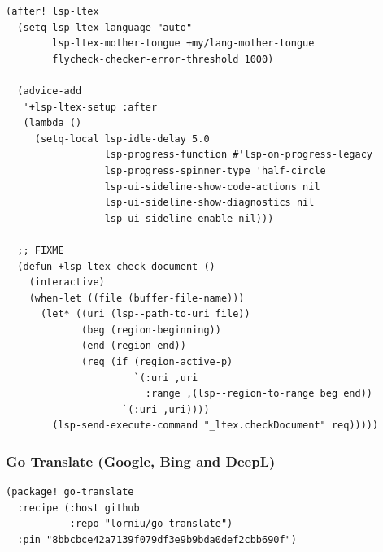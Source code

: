 \documentclass[11pt]{article}
\begin{document}
\begin{verbatim}
(after! lsp-ltex
  (setq lsp-ltex-language "auto"
        lsp-ltex-mother-tongue +my/lang-mother-tongue
        flycheck-checker-error-threshold 1000)

  (advice-add
   '+lsp-ltex-setup :after
   (lambda ()
     (setq-local lsp-idle-delay 5.0
                 lsp-progress-function #'lsp-on-progress-legacy
                 lsp-progress-spinner-type 'half-circle
                 lsp-ui-sideline-show-code-actions nil
                 lsp-ui-sideline-show-diagnostics nil
                 lsp-ui-sideline-enable nil)))

  ;; FIXME
  (defun +lsp-ltex-check-document ()
    (interactive)
    (when-let ((file (buffer-file-name)))
      (let* ((uri (lsp--path-to-uri file))
             (beg (region-beginning))
             (end (region-end))
             (req (if (region-active-p)
                      `(:uri ,uri
                        :range ,(lsp--region-to-range beg end))
                    `(:uri ,uri))))
        (lsp-send-execute-command "_ltex.checkDocument" req)))))
\end{verbatim}

\subsubsection{Go Translate (Google, Bing and DeepL)}
\label{sec:orgc165ecd}

\begin{verbatim}
(package! go-translate
  :recipe (:host github
           :repo "lorniu/go-translate")
  :pin "8bbcbce42a7139f079df3e9b9bda0def2cbb690f")
\end{verbatim}
\end{document}
